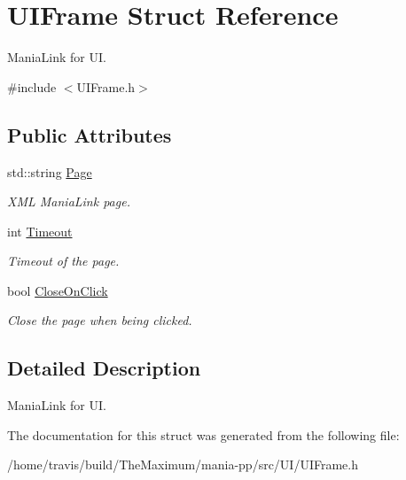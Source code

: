 \hypertarget{structUIFrame}{\section{U\-I\-Frame Struct Reference}
\label{structUIFrame}
}


Mania\-Link for U\-I.  




{\ttfamily \#include $<$U\-I\-Frame.\-h$>$}

\subsection*{Public Attributes}
\begin{DoxyCompactItemize}
\item 
\hypertarget{structUIFrame_a54d853cff6d85507611f0d43a4956ff9}{std\-::string \hyperlink{structUIFrame_a54d853cff6d85507611f0d43a4956ff9}{Page}}\label{structUIFrame_a54d853cff6d85507611f0d43a4956ff9}

\begin{DoxyCompactList}\small\item\em X\-M\-L Mania\-Link page. \end{DoxyCompactList}\item 
\hypertarget{structUIFrame_a5f0ee21f4abbec9a745a2a601e03cd8d}{int \hyperlink{structUIFrame_a5f0ee21f4abbec9a745a2a601e03cd8d}{Timeout}}\label{structUIFrame_a5f0ee21f4abbec9a745a2a601e03cd8d}

\begin{DoxyCompactList}\small\item\em Timeout of the page. \end{DoxyCompactList}\item 
\hypertarget{structUIFrame_a96c8c5d8129595ee565039a84a928ae7}{bool \hyperlink{structUIFrame_a96c8c5d8129595ee565039a84a928ae7}{Close\-On\-Click}}\label{structUIFrame_a96c8c5d8129595ee565039a84a928ae7}

\begin{DoxyCompactList}\small\item\em Close the page when being clicked. \end{DoxyCompactList}\end{DoxyCompactItemize}


\subsection{Detailed Description}
Mania\-Link for U\-I. 

The documentation for this struct was generated from the following file\-:\begin{DoxyCompactItemize}
\item 
/home/travis/build/\-The\-Maximum/mania-\/pp/src/\-U\-I/U\-I\-Frame.\-h\end{DoxyCompactItemize}

